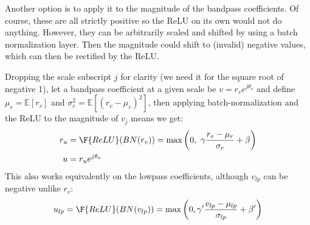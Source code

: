 Another option is to apply it to the magnitude of the bandpass coefficients. Of
course, these are all strictly positive so the ReLU on its own would not do
anything. However, they can be arbitrarily scaled and shifted by using a batch
normalization layer. Then the magnitude could shift to (invalid) negative
values, which can then be rectified by the ReLU.

Dropping the scale subscript $j$ for clarity (we need it for the square root of 
negative 1), let a bandpass coefficient at a given scale be
$v = r_v e^{j\theta_v}$ and define
$\mu_r = \mathbb{E}[r_v]$ and $\sigma_r^2 = \mathbb{E}[(r_v-\mu_r)^2]$, then
applying batch-normalization and the ReLU to the magnitude of $v_j$ means we
get:
\begin{align}
  r_u &= \F{ReLU}(BN(r_v)) = \max\left(0,\ \gamma \frac{r_v-\mu_r}{\sigma_r} + \beta\right) \label{eq:ch6:magrelu_bp} \\
  u &= r_u e^{j\theta_v} \label{eq:ch6:magrelu_bp2}
\end{align}
This also works equivalently on the lowpass coefficients, although $v_{lp}$ can
be negative unlike $r_v$:
\begin{equation}
  u_{lp} = \F{ReLU}(BN(v_{lp})) = \max\left(0, \gamma' \frac{v_{lp} - \mu_{lp}}{\sigma_{lp}} + \beta'\right) \label{eq:ch6:bnrelu_lp}
\end{equation}
%
